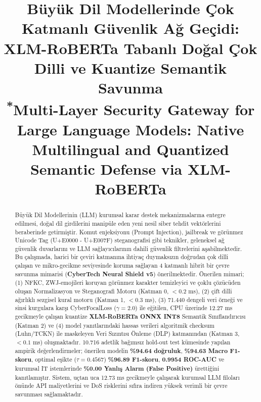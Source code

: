 \documentclass[conference]{IEEEtran}
\begin{document}
\title{Büyük Dil Modellerinde Çok Katmanlı Güvenlik Ağ Geçidi: XLM-RoBERTa Tabanlı Doğal Çok Dilli ve Kuantize Semantik Savunma\\
{\footnotesize \textsuperscript{*}Multi-Layer Security Gateway for Large Language Models: Native Multilingual and Quantized Semantic Defense via XLM-RoBERTa}
}

\author{
\and
{}
}

\maketitle

\begin{abstract}
Büyük Dil Modellerinin (LLM) kurumsal karar destek mekanizmalarına entegre edilmesi, doğal dil girdilerini manipüle eden yeni nesil siber tehdit vektörlerini beraberinde getirmiştir. Komut enjeksiyonu (Prompt Injection), jailbreak ve görünmez Unicode Tag (U+E0000 - U+E007F) steganografisi gibi teknikler, geleneksel ağ güvenlik duvarlarını ve LLM sağlayıcılarının dahili güvenlik filtrelerini aşabilmektedir. Bu çalışmada, harici bir çeviri katmanına ihtiyaç duymaksızın doğrudan çok dilli çalışan ve mikro-gecikme seviyesinde koruma sağlayan 4 katmanlı hibrit bir çevre savunma mimarisi (\textbf{CyberTech Neural Shield v5}) önerilmektedir. Önerilen mimari; (1) NFKC, ZWJ-emojileri koruyan görünmez karakter temizleyici ve çoklu çözücüden oluşan Normalizasyon ve Steganografi Motoru (Katman 0, $<0.2$ ms), (2) çift dilli ağırlıklı sezgisel kural motoru (Katman 1, $<0.3$ ms), (3) 71.440 dengeli veri örneği ve sinsi kurgulara karşı CyberFocalLoss ($\gamma=2.0$) ile eğitilen, CPU üzerinde 12.27 ms gecikmeyle çalışan kuantize \textbf{XLM-RoBERTa ONNX INT8} Semantik Sınıflandırıcısı (Katman 2) ve (4) model yanıtlarındaki hassas verileri algoritmik checksum (Luhn/TCKN) ile maskeleyen Veri Sızıntısı Önleme (DLP) katmanından (Katman 3, $<0.1$ ms) oluşmaktadır. 10.716 adetlik bağımsız hold-out test kümesinde yapılan ampirik değerlendirmeler; önerilen modelin \textbf{\%94.64 doğruluk}, \textbf{\%94.63 Macro F1-skoru}, optimal eşikte ($\tau=0.4567$) \textbf{\%96.89 F1-skoru}, \textbf{0.9954 ROC-AUC} ve kurumsal IT istemlerinde \textbf{\%0.00 Yanlış Alarm (False Positive)} ürettiğini kanıtlamıştır. Sistem, uçtan uca 12.73 ms gecikmeyle çalışarak kurumsal LLM filoları önünde API maliyetlerini ve DoS risklerini sıfıra indiren yüksek verimli bir çevre savunması sağlamaktadır.
\end{abstract}
\end{document}
